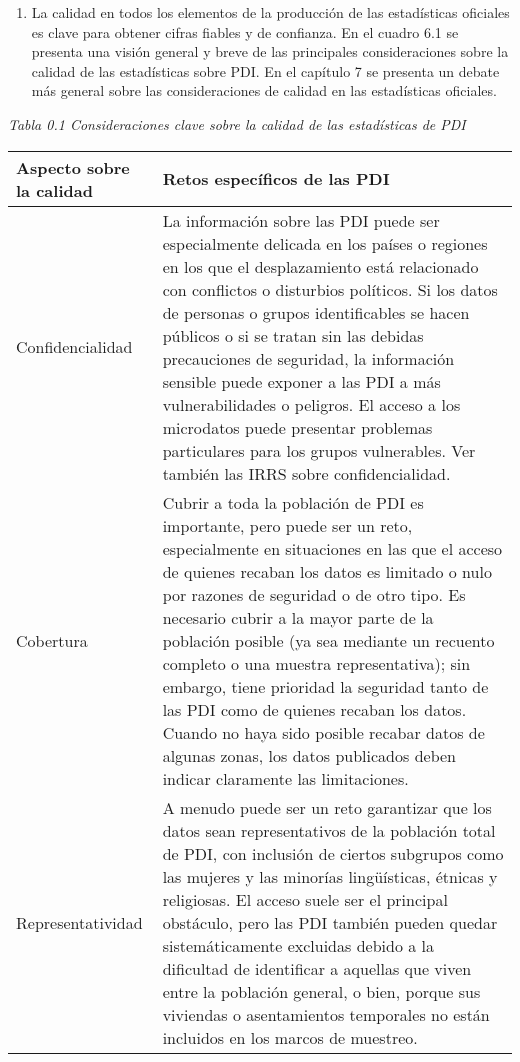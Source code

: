 \documentclass[
]{book}
\begin{document}
\begin{enumerate}
\item
  La calidad en todos los elementos de la producción de las estadísticas oficiales es clave para obtener cifras fiables y de confianza. En el cuadro 6.1 se presenta una visión general y breve de las principales consideraciones sobre la calidad de las estadísticas sobre PDI. En el capítulo 7 se presenta un debate más general sobre las consideraciones de calidad en las estadísticas oficiales.
\end{enumerate}

\emph{Tabla 0.1 Consideraciones clave sobre la calidad de las estadísticas de PDI}

\begin{longtable}[]{@{}
  >{\raggedright\arraybackslash}p{}
  >{\raggedright\arraybackslash}p{}@{}}
\toprule
Aspecto sobre la calidad & Retos específicos de las PDI \\
\midrule
\endhead
Confidencialidad & La información sobre las PDI puede ser especialmente delicada en los países o regiones en los que el desplazamiento está relacionado con conflictos o disturbios políticos. Si los datos de personas o grupos identificables se hacen públicos o si se tratan sin las debidas precauciones de seguridad, la información sensible puede exponer a las PDI a más vulnerabilidades o peligros. El acceso a los microdatos puede presentar problemas particulares para los grupos vulnerables. Ver también las IRRS sobre confidencialidad. \\
Cobertura & Cubrir a toda la población de PDI es importante, pero puede ser un reto, especialmente en situaciones en las que el acceso de quienes recaban los datos es limitado o nulo por razones de seguridad o de otro tipo. Es necesario cubrir a la mayor parte de la población posible (ya sea mediante un recuento completo o una muestra representativa); sin embargo, tiene prioridad la seguridad tanto de las PDI como de quienes recaban los datos. Cuando no haya sido posible recabar datos de algunas zonas, los datos publicados deben indicar claramente las limitaciones. \\
Representatividad & A menudo puede ser un reto garantizar que los datos sean representativos de la población total de PDI, con inclusión de ciertos subgrupos como las mujeres y las minorías lingüísticas, étnicas y religiosas. El acceso suele ser el principal obstáculo, pero las PDI también pueden quedar sistemáticamente excluidas debido a la dificultad de identificar a aquellas que viven entre la población general, o bien, porque sus viviendas o asentamientos temporales no están incluidos en los marcos de muestreo. \\

\end{longtable}
\end{document}
